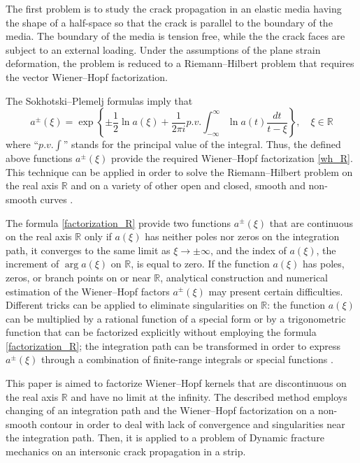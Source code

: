 \documentclass[11pt]{amsart}
\begin{document}
The first problem is to study the crack propagation in an elastic media having the shape of a half-space so that the crack is parallel to the boundary of the media. The boundary of the media is tension free, while the the crack faces are subject to an external loading. Under the assumptions of the plane strain deformation, the problem is reduced to a Riemann--Hilbert problem that requires the vector Wiener--Hopf factorization.

The Sokhotski--Plemelj formulas \cites{nobel, gahov} imply that
$$
	a^\pm(\xi)=\exp\left\{\pm\frac12\ln a(\xi)+\frac1{2\pi i}p.v.\int_{-\infty}^\infty\ln a(t)\frac{dt}{t-\xi}\right\},\quad \xi\in\mathbb R
$$
where ``$p.v.\int$'' stands for the principal value of the integral. Thus, the defined above functions $a^\pm(\xi)$ provide the required Wiener--Hopf factorization \eqref{wh_R}. This technique can be applied in order to solve the Riemann--Hilbert problem \cite{gahov} on the real axis $\mathbb R$ and on a variety of other open and closed, smooth and non-smooth curves \cite{gahov}.

The formula \eqref{factorization_R} provide  two functions $a^\pm(\xi)$ that are continuous on the real axis $\mathbb R$ only if $a(\xi)$ has neither poles nor zeros on the integration path, it converges to the same limit as $\xi\to\pm\infty$, and the index of $a(\xi)$, the increment of $\arg a(\xi)$ on $\mathbb R$, is equal to zero. If the function $a(\xi)$ has poles, zeros, or branch points on or near $\mathbb R$, analytical construction and numerical estimation of the Wiener--Hopf factors $a^\pm(\xi)$ may present certain difficulties. Different tricks can be applied to eliminate singularities on $\mathbb R$: the function $a(\xi)$ can be multiplied by a rational function \cite{gahov} of a special form or by a trigonometric function \cite{antipov-willis} that can be factorized explicitly without employing the formula \eqref{factorization_R}; the integration path can be transformed in order to express $a^\pm(\xi)$ through a combination of finite-range integrals or special functions \cite{abrahams}.

This paper is aimed to factorize Wiener--Hopf kernels that are discontinuous on the real axis $\mathbb R$ and have no limit at the infinity. The described method employs changing of an integration path and the Wiener--Hopf factorization on a non-smooth contour in order to deal with lack of convergence and singularities near the integration path. Then, it is applied to a problem of Dynamic fracture mechanics on an intersonic crack propagation in a strip.
\end{document}
